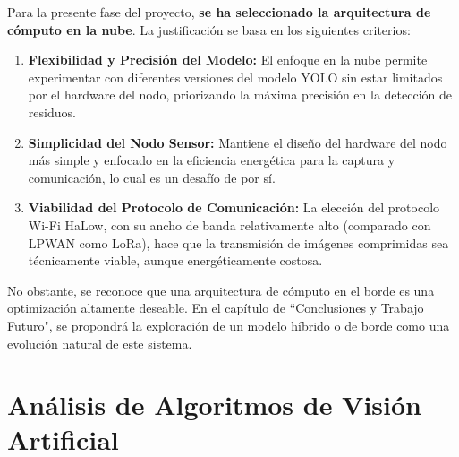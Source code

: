 Para la presente fase del proyecto, \textbf{se ha seleccionado la arquitectura de cómputo en la nube}. La justificación se basa en los siguientes criterios:

\begin{enumerate}
    \item \textbf{Flexibilidad y Precisión del Modelo:} El enfoque en la nube permite experimentar con diferentes versiones del modelo YOLO sin estar limitados por el hardware del nodo, priorizando la máxima precisión en la detección de residuos.
    \item \textbf{Simplicidad del Nodo Sensor:} Mantiene el diseño del hardware del nodo más simple y enfocado en la eficiencia energética para la captura y comunicación, lo cual es un desafío de por sí.
    \item \textbf{Viabilidad del Protocolo de Comunicación:} La elección del protocolo Wi-Fi HaLow, con su ancho de banda relativamente alto (comparado con LPWAN como LoRa), hace que la transmisión de imágenes comprimidas sea técnicamente viable, aunque energéticamente costosa.
\end{enumerate}

No obstante, se reconoce que una arquitectura de cómputo en el borde es una optimización altamente deseable. En el capítulo de ``Conclusiones y Trabajo Futuro", se propondrá la exploración de un modelo híbrido o de borde como una evolución natural de este sistema.




\section{Análisis de Algoritmos de Visión Artificial}

